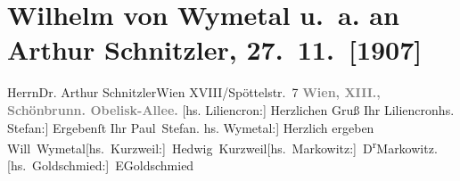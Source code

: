 

         
         \renewcommand{\erwaehntePersonen}{Personen: Louise Schnitzler}
         \renewcommand{\erwaehnteInstitutionen}{Institutionen: Ansorge-Verein}
         \renewcommand{\erwaehnteOrte}{Orte: Edmund-Weiß-Gasse, Gewerbevereinssaal, Schloß Schönbrunn, Wien, XVIII., Währing}
         \renewcommand{\erwaehnteWerke}{}
               \section[Wilhelm von Wymetal u. a. an Arthur Schnitzler, 27. 11. {[}1907{]}]{ Wilhelm von Wymetal u. a. an Arthur Schnitzler,
                    27. 11. {[}1907{]}}\nopagebreak{}\rehead{ }\begin{ledgroupsized}[t]{13cm}\normalsize\beginnumbering \toendnotes[C]{\smallbreak\pagebreak[2]} 
\toendnotes[C]{\smallbreak}\pstart{}{\pb}Herrn\pend{}\pstart{}Dr. Arthur Schnitzler\pend{}\pstart{}Wien XVIII/\pend{}\pstart{}Spöttelstr. 7\pend{}{\bigskip}\pstart
           \noindent{}\centering{}\textcolor{gray}{\textbf{{\pb}Wien, XIII., Schönbrunn.
                                Obelisk-Allee.}}\pend
           \pstart
           {\pb}{[}hs. Liliencron:{]} Herzlichen Gruß\pend
           \pstart Ihr \spacefill\mbox{Liliencron}\pend{}\pstart {[}hs. Stefan:{]} Ergebenſt Ihr \spacefill\mbox{Paul Stefan.}\pend{}\pstart
           \noindent{}{[}hs. Wymetal:{]} Herzlich ergeben\pend
           \pstart \spacefill\mbox{Will Wymetal}\pend{}\pstart \spacefill\mbox{{[}hs. Kurzweil:{]} Hedwig Kurzweil}\pend{}\pstart \spacefill\mbox{{[}hs. Markowitz:{]} D\textsuperscript{r}Markowitz.}\pend{}\pstart \spacefill\mbox{{[}hs. Goldschmied:{]} EGoldschmied}\pend{}\pstart

\end{ledgroupsized}
